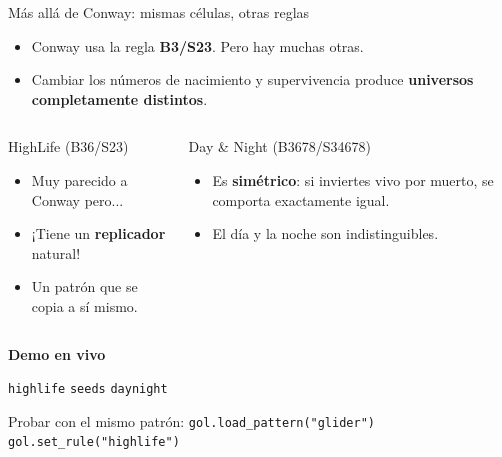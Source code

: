 \documentclass[10pt,aspectratio=169]{beamer}
\newcommand{\demo}[1]{\textcolor{democolor}{\texttt{#1}}}
\begin{document}
\begin{frame}{Más allá de Conway: mismas células, otras reglas}

  \vspace{0.4cm}

  \begin{itemize}
    \item Conway usa la regla \textbf{B3/S23}. Pero hay muchas otras.
    \item Cambiar los números de nacimiento y supervivencia produce
          \textbf{universos completamente distintos}.
  \end{itemize}

  \vspace{0.3cm}

  \begin{columns}[T]
    \begin{block}{HighLife (B36/S23)}
      \begin{itemize}
        \item Muy parecido a Conway pero...
        \item ¡Tiene un \textbf{replicador} natural!
        \item Un patrón que se copia a sí mismo.
      \end{itemize}
    \end{block}

    \begin{block}{Day \& Night (B3678/S34678)}
      \begin{itemize}
        \item Es \textbf{simétrico}: si inviertes vivo por muerto,
              se comporta exactamente igual.
        \item El día y la noche son indistinguibles.
      \end{itemize}
    \end{block}
  \end{columns}

  \vspace{0.3cm}

  \begin{center}
    \textbf{Demo en vivo}

    \demo{highlife} \quad \demo{seeds} \quad \demo{daynight}

    \small Probar con el mismo patrón: \texttt{gol.load\_pattern("glider")}
    \texttt{gol.set\_rule("highlife")}
  \end{center}
\end{frame}
\end{document}
